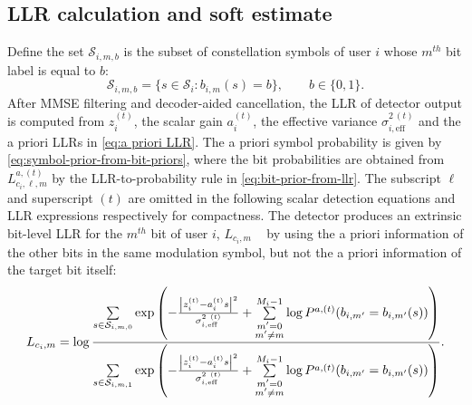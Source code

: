 \subsection{LLR calculation and soft estimate}
\label{sec:LLR calculation and soft estimate}
Define the set $\mathcal{S}_{i,m,b}$ is the subset of constellation symbols of user \(i\) whose $m^{th}$ bit label is equal to \(b\):
\begin{equation}
    \mathcal{S}_{i,m,b}
    =
    \{s\in\mathcal{S}_i:b_{i,m}(s)=b\},
    \qquad b\in\{0,1\}.
\end{equation}
After MMSE filtering and decoder-aided cancellation, the LLR of detector output is computed from $z_i^{(t)}$, the scalar gain $a_i^{(t)}$, the effective variance $\sigma_{i,\mathrm{eff}}^{2~(t)}$ and the a priori LLRs in \eqref{eq:a priori LLR}. 
The a priori symbol probability is given by \eqref{eq:symbol-prior-from-bit-priors}, where the bit probabilities are obtained from $L^{a,(t)}_{c_i,\ell,m}$ by the LLR-to-probability rule in \eqref{eq:bit-prior-from-llr}.
The subscript $\ell$ and superscript $(t)$ are omitted in the following scalar detection equations and LLR expressions respectively for compactness.
The detector produces an extrinsic bit-level LLR for the $m^{th}$ bit of user $i$, $L_{c_{i},m}$ ~\cite{tuchler2002minimum} by using the a priori information of the other bits in the same modulation symbol, but not the a priori information of the target bit itself:
\begin{equation}
    L_{c_{i},m}
    =
    \log
    \frac{
    \sum\limits_{s\in\mathcal{S}_{i,m,0}}
    \exp\left(
    -\frac{\abs{z^{(t)}_{i}-a^{(t)}_{i} s}^2}
    {\sigma_{i,\mathrm{eff}}^{2~(t)}}
    +
    \sum\limits_{\substack{m'=0\\m'\ne m}}^{M_i-1}
    \log P^{a,(t)}(b_{i,m'}=b_{i,m'}(s))
    \right)}
    {\sum\limits_{s\in\mathcal{S}_{i,m,1}}
    \exp\left(
    -\frac{\abs{z^{(t)}_{i}-a^{(t)}_{i} s}^2}
    {\sigma_{i,\mathrm{eff}}^{2~(t)}}
    +
    \sum\limits_{\substack{m'=0\\m'\ne m}}^{M_i-1}
    \log P^{a,(t)}(b_{i,m'}=b_{i,m'}(s))
    \right)} .
    \label{eq:idd-demapper-extrinsic-llr}
\end{equation}

